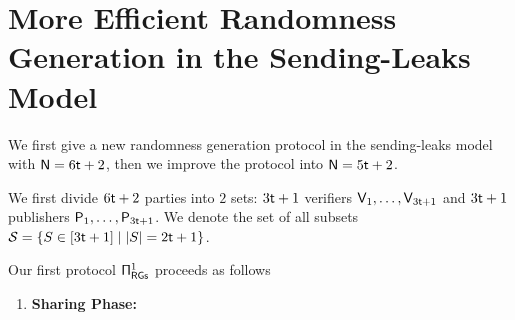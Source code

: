 \section{More Efficient Randomness Generation in the Sending-Leaks Model}

We first give a new randomness generation protocol in the sending-leaks model with $\mathsf{N}  = 6 \mathsf{t}+2$, then we improve the protocol into $\mathsf{N} = 5 \mathsf{t}+2$.

We first divide $6\mathsf{t}+2$ parties into $2$ sets: $3 \mathsf{t}+1$ verifiers $\mathsf{V}_1, \ldots, \mathsf{V}_{3\mathsf{t}+1}$ and $3 \mathsf{t}+1$ publishers $\mathsf{P}_1, \ldots, \mathsf{P}_{3\mathsf{t}+1}$. We denote the set of all subsets $\mathcal{S} = \left\{ S \in [3\mathsf{t}+1]\mid |S| = 2\mathsf{t}+1 \right\}$. 

Our first protocol $\mathsf{\Pi}_{\mathsf{RGs}}^{1}$ proceeds as follows

\begin{enumerate}
    \item \textbf{Sharing Phase:}
\end{enumerate}

